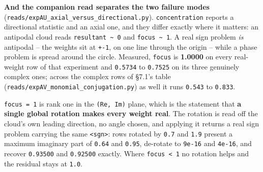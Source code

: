 \documentclass[10pt,letterpaper,twocolumn]{article}
\begin{document}

\textbf{And the companion read separates the two failure modes} (\texttt{reads/\allowbreak{}expAU\_\allowbreak{}axial\_\allowbreak{}versus\_\allowbreak{}directional.\allowbreak{}py}).
\texttt{concentration} reports a directional statistic and an axial one, and they differ exactly where it
matters: an antipodal cloud reads \texttt{resultant\ \textasciitilde{}\ 0} and \texttt{focus\ \textasciitilde{}\ 1}. A real sign problem \emph{is}
antipodal -- the weights sit at \texttt{+\allowbreak{}-{}\allowbreak{}1}, on one line through the origin -- while a phase problem is
spread around the circle. Measured, \texttt{focus} is \textbf{1.0000} on every real-weight row of that
experiment and \texttt{0.\allowbreak{}5734} to \texttt{0.\allowbreak{}7525} on its three genuinely complex ones; across the complex rows of
§7.1's table (\texttt{reads/\allowbreak{}expAV\_\allowbreak{}monomial\_\allowbreak{}conjugation.\allowbreak{}py}) as well it runs \texttt{0.\allowbreak{}543} to \texttt{0.\allowbreak{}833}.

\texttt{focus\ =\allowbreak{}\ 1} is rank one in the \texttt{(\allowbreak{}Re,\allowbreak{}\ Im)\allowbreak{}} plane, which is the statement that \textbf{a single global
rotation makes every weight real}. The rotation is read off the cloud's own leading direction, no
angle chosen, and applying it returns a real sign
problem carrying the same \texttt{\textbar{}\allowbreak{}\textless{}\allowbreak{}sgn\textgreater{}\allowbreak{}\textbar{}\allowbreak{}}: rows rotated by \texttt{0.\allowbreak{}7} and \texttt{1.\allowbreak{}9} present a maximum imaginary
part of \texttt{0.\allowbreak{}64} and \texttt{0.\allowbreak{}95}, de-rotate to \texttt{9e-{}\allowbreak{}16} and \texttt{4e-{}\allowbreak{}16}, and recover \texttt{0.\allowbreak{}93500} and \texttt{0.\allowbreak{}92500}
exactly. Where \texttt{focus\ \textless{}\allowbreak{}\ 1} no rotation helps and the residual stays at \texttt{1.\allowbreak{}0}.
\end{document}
